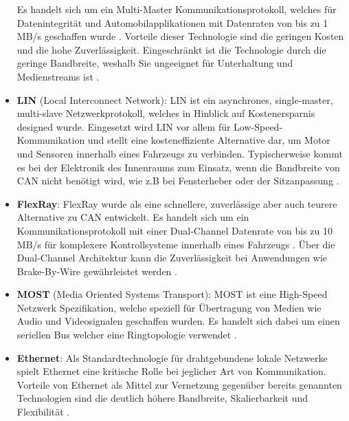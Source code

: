 \begin{itemize}
                Es handelt sich um ein Multi-Master Kommunikationsprotokoll, welches für Datenintegrität und Automobilapplikationen mit Datenraten von bis zu 1 MB/s geschaffen wurde \cite{wolf2004security}. Vorteile
                dieser Technologie sind die geringen Kosten und die hohe Zuverlässigkeit. Eingeschränkt ist die Technologie durch die geringe Bandbreite, weshalb Sie
                ungeeignet für Unterhaltung und Medienstreams ist \cite{TW_huang2018vehicle}.
                \item \textbf{LIN} (Local Interconnect Network): LIN ist ein asynchrones, single-master, multi-slave Netzwerkprotokoll, welches in Hinblick auf Kostenersparnis 
                designed wurde. Eingesetzt wird LIN vor allem für Low-Speed-Kommunikation und stellt eine kosteneffiziente Alternative dar, um Motor und Sensoren innerhalb 
                eines Fahrzeugs zu verbinden. Typischerweise kommt es bei der Elektronik des Innenraums zum Einsatz, wenn die Bandbreite von CAN nicht benötigt wird, wie z.B bei Fensterheber
                oder der Sitzanpassung \cite{TW_huang2018vehicle}.
                \item \textbf{FlexRay}: FlexRay wurde als eine schnellere, zuverlässige aber auch teurere Alternative zu CAN entwickelt. Es handelt sich um ein Kommunikationsprotokoll mit einer
                Dual-Channel Datenrate von bis zu 10 MB/s für komplexere Kontrollsysteme innerhalb eines Fahrzeugs \cite{wolf2004security}. Über die Dual-Channel Architektur kann die Zuverlässigkeit
                bei Anwendungen wie Brake-By-Wire gewährleistet werden \cite{TW_huang2018vehicle}. 
                \item \textbf{MOST} (Media Oriented Systems Transport): MOST ist eine High-Speed Netzwerk Spezifikation, welche speziell für Übertragung von Medien wie Audio und Videosignalen 
                geschaffen wurden. Es handelt sich dabei um einen seriellen Bus welcher eine Ringtopologie verwendet \cite{TW_huang2018vehicle}.
                \item \textbf{Ethernet}: Als Standardtechnologie für drahtgebundene lokale Netzwerke spielt Ethernet eine kritische Rolle bei jeglicher Art von Kommunikation.
                Vorteile von Ethernet als Mittel zur Vernetzung gegenüber bereits genannten Technologien sind die deutlich höhere Bandbreite, Skalierbarkeit und Flexibilität \cite{hank2013automotive}\cite{TW_huang2018vehicle}. 
            \end{itemize}
